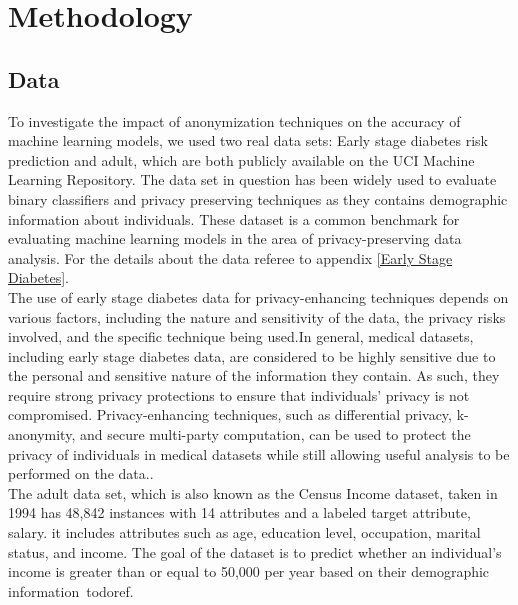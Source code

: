 \section{Methodology}
\label{sec:methodology}
\subsection{Data}
\label{data}
To investigate the impact of anonymization techniques on the accuracy of machine learning models, we used two real data sets: Early stage diabetes risk prediction\cite{ucidiabetes} and adult\cite{UCIAdultDataset}, which are both publicly available on the UCI Machine Learning Repository. The data set in question has been widely used to evaluate binary classifiers and privacy preserving techniques as they contains demographic information about individuals\cite{rodriguez2020contribution,oprescu2022energy}. These dataset is a common benchmark for evaluating machine learning models in the area of privacy-preserving data analysis. For the details about the data referee to appendix \ref{Early Stage Diabetes}.\\
The use of early stage diabetes data for privacy-enhancing techniques depends on various factors, including the nature and sensitivity of the data, the privacy risks involved, and the specific technique being used.In general, medical datasets, including early stage diabetes data, are considered to be highly sensitive due to the personal and sensitive nature of the information they contain. As such, they require strong privacy protections to ensure that individuals' privacy is not compromised. Privacy-enhancing techniques, such as differential privacy, k-anonymity, and secure multi-party computation, can be used to protect the privacy of individuals in medical datasets while still allowing useful analysis to be performed on the data..\\
The adult data set, which is also known as the Census Income dataset, taken in 1994 has 48,842 instances with 14 attributes and a labeled target attribute, salary. it includes attributes such as age, education level, occupation, marital status, and income. The goal of the dataset is to predict whether an individual's income is greater than or equal to 50,000 per year based on their demographic information\ todo{ref}. \\
